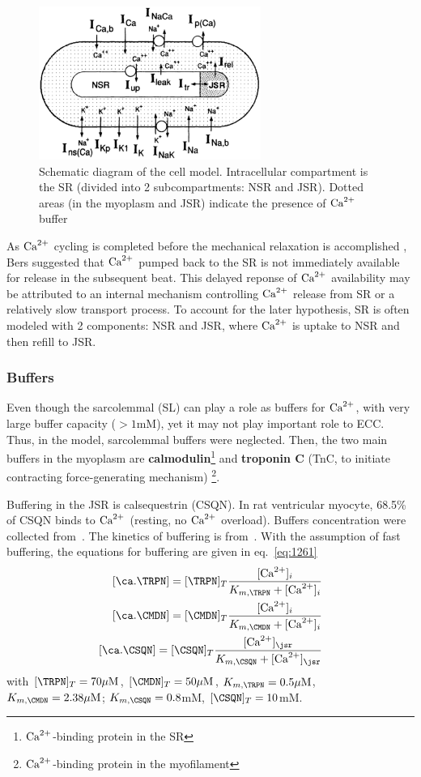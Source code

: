 \begin{figure}[hbt]
  \centerline{\includegraphics[height=5cm,
    angle=0]{./images/LR_phase2_cell.eps}}
  \caption{Schematic diagram of the cell model. Intracellular
    compartment is the SR (divided into 2 subcompartments: NSR and
    JSR). Dotted areas (in the myoplasm and JSR) indicate the presence
    of ${\text{Ca}^{2+}}$ buffer}
  \label{fig:LR_phase2}
\end{figure}

As ${\text{Ca}^{2+}}$ cycling is completed before the mechanical relaxation is accomplished
\citep{bers1987,bers1989}, Bers suggested that ${\text{Ca}^{2+}}$ pumped back to the SR
is not immediately available for release in the subsequent beat. This delayed reponse of ${\text{Ca}^{2+}}$
availability may be attributed to an internal mechanism controlling ${\text{Ca}^{2+}}$
release from SR or a relatively slow transport process. To account for the later
hypothesis, SR is often modeled with 2 components: NSR and JSR, where ${\text{Ca}^{2+}}$	is
uptake to NSR and then refill to JSR. 

\subsubsection{Buffers}
\label{sec:buffers-3}

Even though the sarcolemmal (SL) can play a role as buffers for ${\text{Ca}^{2+}}$, with
very large buffer capacity ($>1$mM), yet it may not play important role to ECC.
Thus, in the model, sarcolemmal buffers were neglected. 
Then, the two main buffers in the myoplasm are
{\bf calmodulin}\footnote{${\text{Ca}^{2+}}$-binding protein in the SR} and
{\bf
  troponin C} (TnC, to initiate contracting force-generating mechanism)
  \footnote{${\text{Ca}^{2+}}$-binding protein in the myofilament}.

Buffering in the JSR is calsequestrin (CSQN). In rat
ventricular myocyte, 68.5\% of CSQN binds to ${\text{Ca}^{2+}}$ (resting, no ${\text{Ca}^{2+}}$
overload).  Buffers concentration were collected
from~\citep{wier1986}. The kinetics of buffering is
from~\citep{robertson1981}. With the assumption of fast buffering, the
equations for buffering are given in eq.~\eqref{eq:1261}
\begin{equation}
  \label{eq:1261}
  \begin{split}
    [\ca.\TRPN] = [\TRPN]_T\frac{[\Ca]_i}{K_{m,\TRPN}+[\Ca]_i} \\
    [\ca.\CMDN] = [\CMDN]_T \frac{[\Ca]_i}{K_{m,\CMDN}+[\Ca]_i} \\
    [\ca.\CSQN] = [{\CSQN}]_T\frac{[\Ca]_\jsr}{K_{m,\CSQN}+[\Ca]_\jsr} \\
  \end{split}
\end{equation}
with $[\TRPN]_T = 70\muM$, $[\CMDN]_T=50\muM$, $K_{m,\TRPN}=0.5\muM$,
$K_{m,\CMDN}=2.38\muM$; $K_{m,\CSQN}=0.8$mM, $[\CSQN]_T = 10$mM. 


